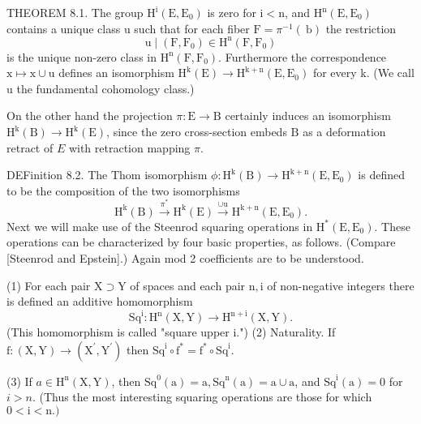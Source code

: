 \documentclass[10pt]{article}
\begin{document}
THEOREM 8.1. The group $\mathrm{H}^{\mathrm{i}}\left(\mathrm{E}, \mathrm{E}_{0}\right)$ is zero for $\mathrm{i}<\mathrm{n}$, and $\mathrm{H}^{\mathrm{n}}\left(\mathrm{E}, \mathrm{E}_{0}\right)$ contains a unique class u such that for each fiber $\mathrm{F}=\pi^{-1}(\mathrm{~b})$ the restriction
$$
\mathrm{u} \mid\left(\mathrm{F}, \mathrm{F}_{0}\right) \in \mathrm{H}^{\mathrm{n}}\left(\mathrm{F}, \mathrm{F}_{0}\right)
$$
is the unique non-zero class in $\mathrm{H}^{\mathrm{n}}\left(\mathrm{F}, \mathrm{F}_{0}\right)$. Furthermore the correspondence $\mathrm{x} \mapsto \mathrm{x} \cup \mathrm{u}$ defines an isomorphism $\mathrm{H}^{\mathrm{k}}(\mathrm{E}) \rightarrow \mathrm{H}^{\mathrm{k}+\mathrm{n}}\left(\mathrm{E}, \mathrm{E}_{0}\right)$ for every k. (We call u the fundamental cohomology class.)

On the other hand the projection $\pi: \mathrm{E} \rightarrow \mathrm{B}$ certainly induces an isomorphism $\mathrm{H}^{\mathrm{k}}(\mathrm{B}) \rightarrow \mathrm{H}^{\mathrm{k}}(\mathrm{E})$, since the zero cross-section embeds $\mathrm{B}$ as a deformation retract of $E$ with retraction mapping $\pi$.

DEFinition 8.2. The Thom isomorphism $\phi: \mathrm{H}^{\mathrm{k}}(\mathrm{B}) \rightarrow \mathrm{H}^{\mathrm{k}+\mathrm{n}}\left(\mathrm{E}, \mathrm{E}_{0}\right)$ is defined to be the composition of the two isomorphisms
$$
\mathrm{H}^{\mathrm{k}}(\mathrm{B}) \stackrel{\pi^{*}}{\longrightarrow} \mathrm{H}^{\mathrm{k}}(\mathrm{E}) \stackrel{\cup \mathrm{u}}{\longrightarrow} \mathrm{H}^{\mathrm{k}+\mathrm{n}}\left(\mathrm{E}, \mathrm{E}_{0}\right) .
$$
Next we will make use of the Steenrod squaring operations in $\mathrm{H}^{*}\left(\mathrm{E}, \mathrm{E}_{0}\right)$. These operations can be characterized by four basic properties, as follows. (Compare [Steenrod and Epstein].) Again mod 2 coefficients are to be understood.

(1) For each pair $\mathrm{X} \supset \mathrm{Y}$ of spaces and each pair $\mathrm{n}, \mathrm{i}$ of non-negative integers there is defined an additive homomorphism
$$
\mathrm{Sq}^{\mathrm{i}}: \mathrm{H}^{\mathrm{n}}(\mathrm{X}, \mathrm{Y}) \rightarrow \mathrm{H}^{\mathrm{n}+\mathrm{i}}(\mathrm{X}, \mathrm{Y}) .
$$
(This homomorphism is called "square upper i.") (2) Naturality. If $\mathrm{f}:(\mathrm{X}, \mathrm{Y}) \rightarrow\left(\mathrm{X}^{\prime}, \mathrm{Y}^{\prime}\right)$ then $\mathrm{Sq}^{\mathrm{i}} \circ \mathrm{f}^{*}=\mathrm{f}^{*} \circ \mathrm{Sq}^{\mathrm{i}}$.

(3) If $a \in \mathrm{H}^{\mathrm{n}}(\mathrm{X}, \mathrm{Y})$, then $\mathrm{Sq}^{0}(\mathrm{a})=\mathrm{a}, \mathrm{Sq}^{\mathrm{n}}(\mathrm{a})=\mathrm{a} \cup \mathrm{a}$, and $\mathrm{Sq}^{\mathrm{i}}(\mathrm{a})=0$ for $i>n$. (Thus the most interesting squaring operations are those for which $0<\mathrm{i}<\mathrm{n} .)$
\end{document}
